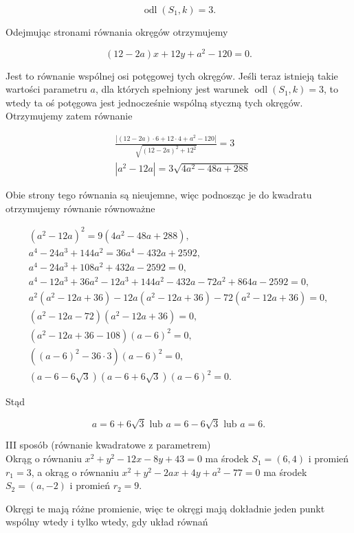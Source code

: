 \documentclass[10pt]{article}
\begin{document}
$$
\operatorname{odl}\left(S_{1}, k\right)=3 .
$$

Odejmując stronami równania okręgów otrzymujemy

$$
(12-2 a) x+12 y+a^{2}-120=0 .
$$

Jest to równanie wspólnej osi potęgowej tych okręgów. Jeśli teraz istnieją takie wartości parametru $a$, dla których spełniony jest warunek $\operatorname{odl}\left(S_{1}, k\right)=3$, to wtedy ta oś potęgowa jest jednocześnie wspólną styczną tych okręgów. Otrzymujemy zatem równanie

$$
\begin{aligned}
& \frac{\left|(12-2 a) \cdot 6+12 \cdot 4+a^{2}-120\right|}{\sqrt{(12-2 a)^{2}+12^{2}}}=3 \\
& \left|a^{2}-12 a\right|=3 \sqrt{4 a^{2}-48 a+288}
\end{aligned}
$$

Obie strony tego równania są nieujemne, więc podnosząc je do kwadratu otrzymujemy równanie równoważne

$$
\begin{gathered}
\left(a^{2}-12 a\right)^{2}=9\left(4 a^{2}-48 a+288\right), \\
a^{4}-24 a^{3}+144 a^{2}=36 a^{4}-432 a+2592, \\
a^{4}-24 a^{3}+108 a^{2}+432 a-2592=0, \\
a^{4}-12 a^{3}+36 a^{2}-12 a^{3}+144 a^{2}-432 a-72 a^{2}+864 a-2592=0, \\
a^{2}\left(a^{2}-12 a+36\right)-12 a\left(a^{2}-12 a+36\right)-72\left(a^{2}-12 a+36\right)=0, \\
\left(a^{2}-12 a-72\right)\left(a^{2}-12 a+36\right)=0, \\
\left(a^{2}-12 a+36-108\right)(a-6)^{2}=0, \\
\left((a-6)^{2}-36 \cdot 3\right)(a-6)^{2}=0, \\
(a-6-6 \sqrt{3})(a-6+6 \sqrt{3})(a-6)^{2}=0 .
\end{gathered}
$$

Stąd

$$
a=6+6 \sqrt{3} \text { lub } a=6-6 \sqrt{3} \text { lub } a=6 .
$$

III sposób (równanie kwadratowe z parametrem)\\
Okrąg o równaniu $x^{2}+y^{2}-12 x-8 y+43=0$ ma środek $S_{1}=(6,4)$ i promień $r_{1}=3$, a okrąg o równaniu $x^{2}+y^{2}-2 a x+4 y+a^{2}-77=0$ ma środek $S_{2}=(a,-2)$ i promień $r_{2}=9$.

Okręgi te mają różne promienie, więc te okręgi mają dokładnie jeden punkt wspólny wtedy i tylko wtedy, gdy układ równań
\end{document}
